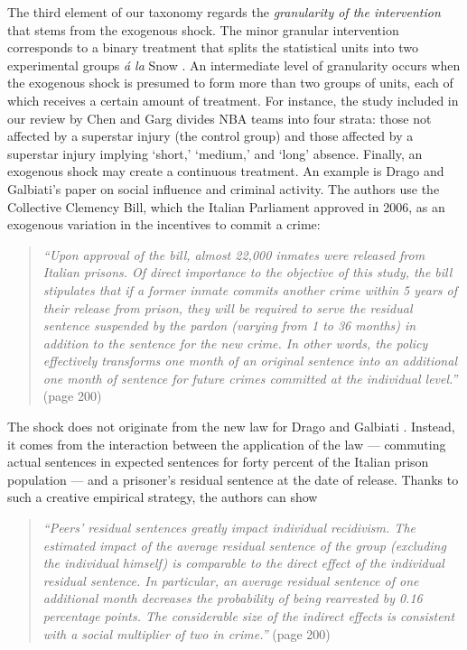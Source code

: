 \documentclass[11pt]{article}
\begin{document}
\begin{refsection}
The third element of our taxonomy regards the \textit{granularity of the intervention} that stems from the exogenous shock. The minor granular intervention corresponds to a binary treatment that splits the statistical units into two experimental groups \textit{\'a la} Snow \autocite*{snow_1855}. An intermediate level of granularity occurs when the exogenous shock is presumed to form more than two groups of units, each of which receives a certain amount of treatment. For instance, the study included in our review by Chen and Garg \autocite*{chen20181239} divides NBA teams into four strata: those not affected by a superstar injury (the control group) and those affected by a superstar injury implying `short,' `medium,' and `long'  absence. Finally, an exogenous shock may create a continuous treatment.  An example is  Drago and Galbiati's \autocite*{drago_galbiati_2012} paper on social influence and criminal activity. The authors use the Collective  Clemency Bill, which the Italian Parliament approved in 2006, as an exogenous  variation in the incentives to commit a crime: 

\begin{quote}
  \textit{
    ``Upon approval of the bill, almost 22,000 inmates were released from
    Italian prisons. Of direct importance to the objective of this study, the
    bill stipulates that if a former inmate commits another crime within 5 years
    of their release from prison, they will be required to serve the residual
    sentence suspended by the pardon (varying from 1 to 36 months) in addition
    to the sentence for the new crime. In other words, the policy effectively
    transforms one month of an original sentence into an additional one month of
    sentence for future crimes committed at the individual level.''
  }
  (page 200)
\end{quote}

The shock does not originate from the new law for Drago and Galbiati \autocite*{drago_galbiati_2012}. Instead, it comes from the interaction between the application of the law  --- commuting actual sentences in expected sentences for forty percent of the Italian prison population --- and a prisoner's residual sentence at the date of release. Thanks to such a creative empirical strategy,  the authors can show

\begin{quote}
  \textit{
    ``Peers' residual sentences greatly impact individual recidivism. The
    estimated impact of the average residual sentence of the group (excluding
    the individual himself) is comparable to the direct effect of the individual
    residual sentence. In particular, an average residual sentence of one
    additional month decreases the probability of being rearrested by 0.16
    percentage points. The considerable size of the indirect effects is
    consistent with a social multiplier of two in crime.'' }
    (page 200)
\end{quote}


\end{refsection}
\end{document}
